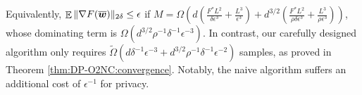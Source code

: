 Equivalently, $\mathop{\mathbb{E}}\|\nabla F(\overline{{\boldsymbol{w}}})\|_{2\delta}\le \epsilon$ if $M=\Omega\left( d(\frac{F^*L^2}{\delta\epsilon^3}+\frac{L^3}{\epsilon^3}) + d^{3/2}(\frac{F^*L^2}{\rho\delta\epsilon^3} + \frac{L^3}{\rho\epsilon^3}) \right)$, whose dominating term is $\Omega(d^{3/2}\rho^{-1}\delta^{-1}\epsilon^{-3})$. In contrast, our carefully designed algorithm only requires $\tilde\Omega(d\delta^{-1}\epsilon^{-3}+d^{3/2}\rho^{-1}\delta^{-1}\epsilon^{-2})$ samples, as proved in Theorem \ref{thm:DP-O2NC:convergence}. Notably, the naive algorithm suffers an additional cost of $\epsilon^{-1}$ for privacy. 
